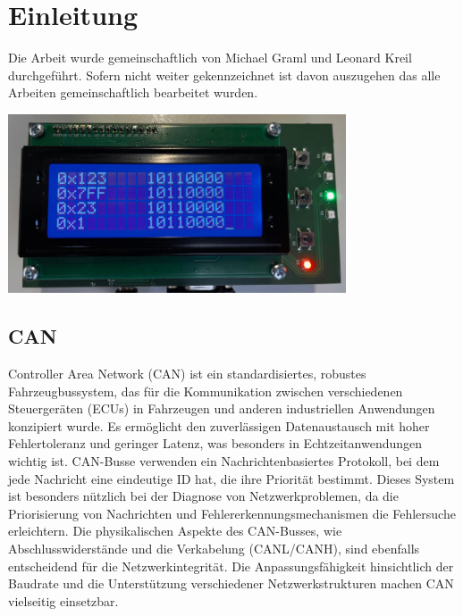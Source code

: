 \chapter{Einleitung}
\label{sec:Einleitung}
\noindent Die Arbeit wurde gemeinschaftlich von Michael Graml und Leonard Kreil durchgeführt. Sofern nicht weiter gekennzeichnet ist davon auszugehen das alle Arbeiten gemeinschaftlich bearbeitet wurden.\\

\begin {centering}
\includegraphics[width=0.75\textwidth]{img/Can_to_go_system.png}
\label{fig: CAN-to-go System}
\end {centering}  


\section{CAN}
Controller Area Network (CAN) ist ein standardisiertes, robustes Fahrzeugbussystem, das für die Kommunikation zwischen verschiedenen Steuergeräten (ECUs) in Fahrzeugen und anderen industriellen Anwendungen konzipiert wurde. Es ermöglicht den zuverlässigen Datenaustausch mit hoher Fehlertoleranz und geringer Latenz, was besonders in Echtzeitanwendungen wichtig ist. CAN-Busse verwenden ein Nachrichtenbasiertes Protokoll, bei dem jede Nachricht eine eindeutige ID hat, die ihre Priorität bestimmt. Dieses System ist besonders nützlich bei der Diagnose von Netzwerkproblemen, da die Priorisierung von Nachrichten und Fehlererkennungsmechanismen die Fehlersuche erleichtern. Die physikalischen Aspekte des CAN-Busses, wie Abschlusswiderstände und die Verkabelung (CANL/CANH), sind ebenfalls entscheidend für die Netzwerkintegrität. Die Anpassungsfähigkeit hinsichtlich der Baudrate und die Unterstützung verschiedener Netzwerkstrukturen machen CAN vielseitig einsetzbar.\\

